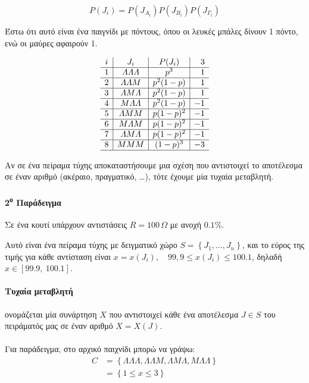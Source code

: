 \documentclass[11pt,a4paper,notitlepage,fleqn,draft]{article}
\begin{document}
	\[
	P(J_i) = P(J_{A_i}) P(J_{B_i}) P(J_{\varGamma_i})
	\]
	
	Έστω ότι αυτό είναι ένα παιγνίδι με πόντους, όπου οι λευκές μπάλες
	δίνουν 1 πόντο, ενώ οι μαύρες αφαιρούν 1.
	
	\[
	\begin{array}{c|c|c|r}
		i &              J_i               &  P(J_i)  & 3 \\ \hline
		1 & \varLambda\varLambda\varLambda &   p^3    & 1 \\ \hline
		2 &     \varLambda\varLambda M     & p^2(1-p) & 1 \\ \hline
		3 &    \varLambda M \varLambda     & p^2(1-p) & 1 \\ \hline
		4 &     M\varLambda\varLambda      & p^2(1-p) & -1 \\ \hline
		5 &         \varLambda M M         & p(1-p)^2 & -1 \\ \hline
		6 &         M \varLambda M         & p(1-p)^2 & -1 \\ \hline
		7 &    \varLambda M \varLambda     & p(1-p)^2 & -1 \\ \hline
		8 &             M M M              & (1-p)^3  & -3 \\ \hline
	\end{array}
	\]
	
	Αν σε ένα πείραμα τύχης αποκαταστήσουμε μια σχέση που αντιστοιχεί
	το αποτέλεσμα σε έναν αριθμό (ακέραιο, πραγματικό, \dots), τότε
	έχουμε μία τυχαία μεταβλητή.
	
	\paragraph{2\textsuperscript{ο} Παράδειγμα}
	Σε ένα κουτί υπάρχουν αντιστάσεις \( R= 100\, \Omega \)
	με ανοχή \( 0.1\% \).
	
	Αυτό είναι ένα πείραμα τύχης με δειγματικό χώρο
	\( S = \left\lbrace J_1,\dots,J_n \right\rbrace \), και το εύρος
	της τιμής για κάθε αντίσταση είναι \( x=x(J_i), \quad
	99,9 \leq x(J_i) \leq 100.1 \), δηλαδή \( x \in [99.9,\ 100.1] \).
	
	\paragraph{Τυχαία μεταβλητή} ονομάζεται μία συνάρτηση \( X \)
	που αντιστοιχεί κάθε ένα αποτέλεσμα \( J \in S \) του πειράματός μας
	σε έναν αριθμό \( X=X(J) \).
	
	\paragraph{}
	Για παράδειγμα, στο αρχικό παιχνίδι μπορώ να γράψω:
	\begin{align*}
		C &= \left\lbrace \varLambda\varLambda\varLambda,
		\varLambda\varLambda M, \varLambda M \varLambda,
		M\varLambda\varLambda \right\rbrace
		\\ &= \left\lbrace 1 \leq x \leq 3 \right\rbrace
	\end{align*}
	
\end{document}
